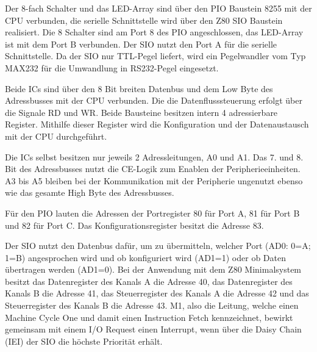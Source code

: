 Der 8-fach Schalter und das LED-Array sind über den PIO Baustein 8255 mit der CPU verbunden, die serielle Schnittstelle wird über den Z80 SIO Baustein realisiert. Die 8 Schalter sind am Port 8 des PIO angeschlossen, das LED-Array ist mit dem Port B verbunden. Der SIO nutzt den Port A für die serielle Schnittstelle. Da der SIO nur TTL-Pegel liefert, wird ein Pegelwandler vom Typ MAX232 für die Umwandlung in RS232-Pegel eingesetzt.

Beide ICs sind über den 8 Bit breiten Datenbus und dem Low Byte des Adressbusses mit der CPU verbunden. Die die Datenflusssteuerung erfolgt über die Signale RD und WR. Beide Bausteine besitzen intern 4 adressierbare Register. Mithilfe dieser Register wird die Konfiguration und der Datenaustausch mit der CPU durchgeführt.

Die ICs selbst besitzen nur jeweils 2 Adressleitungen, A0 und A1. Das 7. und 8. Bit des Adressbusses nutzt die CE-Logik zum Enablen der Peripherieeinheiten. A3 bis A5 bleiben bei der Kommunikation mit der Peripherie ungenutzt ebenso wie das gesamte High Byte des Adressbusses.

Für den PIO lauten die Adressen der Portregister 80 für Port A, 81 für Port B und 82 für Port C. Das Konfigurationsregister besitzt die Adresse 83.

Der SIO nutzt den Datenbus dafür, um zu übermitteln, welcher Port (AD0: 0=A; 1=B) angesprochen wird und ob konfiguriert wird (AD1=1) oder ob Daten übertragen werden (AD1=0). Bei der Anwendung mit dem Z80 Minimalsystem besitzt das Datenregister des Kanals A die Adresse 40, das Datenregister des Kanals B die Adresse 41, das Steuerregister des Kanals A die Adresse 42 und das Steuerregister des Kanals B die Adresse 43. M1, also die Leitung, welche einen Machine Cycle One und damit einen Instruction Fetch kennzeichnet, bewirkt gemeinsam mit einem I/O Request einen Interrupt, wenn über die Daisy Chain (IEI) der SIO die höchste Priorität erhält.


